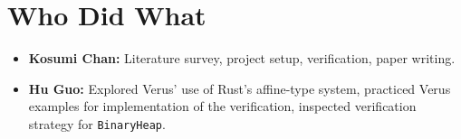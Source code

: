 \documentclass[conference]{IEEEtran}
\begin{document}
\section{Who Did What}
\begin{itemize}
\item \textbf{Kosumi Chan:} Literature survey, project setup, verification, paper writing. 
\item \textbf{Hu Guo:} Explored Verus' use of Rust's affine-type system, practiced Verus examples for implementation of the verification, inspected verification strategy for \texttt{BinaryHeap}.
\end{itemize}
\printbibliography
\end{document}
